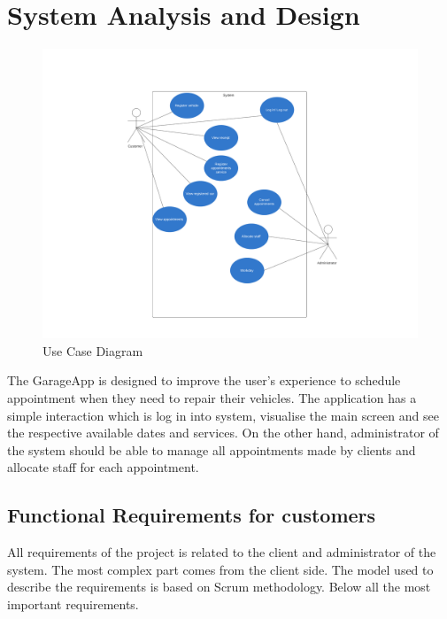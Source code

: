 \chapter{System Analysis and Design}


\begin{figure}
  \includegraphics[width=\linewidth]{system_diagram.png}
  \caption{Use Case Diagram}
  \label{fig:diagram}
\end{figure}

The GarageApp is designed  to improve the user's experience to schedule appointment when they need to repair their vehicles. The application has a simple interaction which is log in into system, visualise the main screen and see the respective available dates and services. On the other hand, administrator of the system should be able to manage all appointments made by clients and allocate staff for each appointment.

\section{Functional Requirements for customers}

All requirements of the project is related to the client and administrator of the system. The most complex part comes from the client side. The model used to describe the requirements is based on Scrum methodology. Below all the most important requirements.


